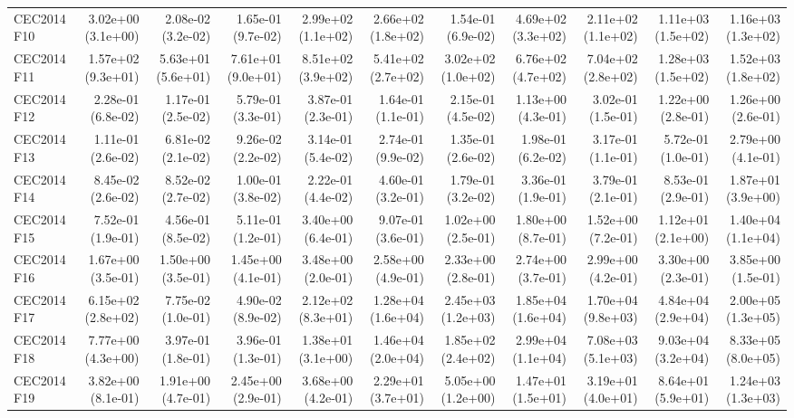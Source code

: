 \begin{longtable}{lrrrrrrrrrr}
CEC2014 F10 & 3.02e+00 (3.1e+00) & 2.08e-02 (3.2e-02) & 1.65e-01 (9.7e-02) & 2.99e+02 (1.1e+02) & 2.66e+02 (1.8e+02) & 1.54e-01 (6.9e-02) & 4.69e+02 (3.3e+02) & 2.11e+02 (1.1e+02) & 1.11e+03 (1.5e+02) & 1.16e+03 (1.3e+02) \\
CEC2014 F11 & 1.57e+02 (9.3e+01) & 5.63e+01 (5.6e+01) & 7.61e+01 (9.0e+01) & 8.51e+02 (3.9e+02) & 5.41e+02 (2.7e+02) & 3.02e+02 (1.0e+02) & 6.76e+02 (4.7e+02) & 7.04e+02 (2.8e+02) & 1.28e+03 (1.5e+02) & 1.52e+03 (1.8e+02) \\
CEC2014 F12 & 2.28e-01 (6.8e-02) & 1.17e-01 (2.5e-02) & 5.79e-01 (3.3e-01) & 3.87e-01 (2.3e-01) & 1.64e-01 (1.1e-01) & 2.15e-01 (4.5e-02) & 1.13e+00 (4.3e-01) & 3.02e-01 (1.5e-01) & 1.22e+00 (2.8e-01) & 1.26e+00 (2.6e-01) \\
CEC2014 F13 & 1.11e-01 (2.6e-02) & 6.81e-02 (2.1e-02) & 9.26e-02 (2.2e-02) & 3.14e-01 (5.4e-02) & 2.74e-01 (9.9e-02) & 1.35e-01 (2.6e-02) & 1.98e-01 (6.2e-02) & 3.17e-01 (1.1e-01) & 5.72e-01 (1.0e-01) & 2.79e+00 (4.1e-01) \\
CEC2014 F14 & 8.45e-02 (2.6e-02) & 8.52e-02 (2.7e-02) & 1.00e-01 (3.8e-02) & 2.22e-01 (4.4e-02) & 4.60e-01 (3.2e-01) & 1.79e-01 (3.2e-02) & 3.36e-01 (1.9e-01) & 3.79e-01 (2.1e-01) & 8.53e-01 (2.9e-01) & 1.87e+01 (3.9e+00) \\
CEC2014 F15 & 7.52e-01 (1.9e-01) & 4.56e-01 (8.5e-02) & 5.11e-01 (1.2e-01) & 3.40e+00 (6.4e-01) & 9.07e-01 (3.6e-01) & 1.02e+00 (2.5e-01) & 1.80e+00 (8.7e-01) & 1.52e+00 (7.2e-01) & 1.12e+01 (2.1e+00) & 1.40e+04 (1.1e+04) \\
CEC2014 F16 & 1.67e+00 (3.5e-01) & 1.50e+00 (3.5e-01) & 1.45e+00 (4.1e-01) & 3.48e+00 (2.0e-01) & 2.58e+00 (4.9e-01) & 2.33e+00 (2.8e-01) & 2.74e+00 (3.7e-01) & 2.99e+00 (4.2e-01) & 3.30e+00 (2.3e-01) & 3.85e+00 (1.5e-01) \\
CEC2014 F17 & 6.15e+02 (2.8e+02) & 7.75e-02 (1.0e-01) & 4.90e-02 (8.9e-02) & 2.12e+02 (8.3e+01) & 1.28e+04 (1.6e+04) & 2.45e+03 (1.2e+03) & 1.85e+04 (1.6e+04) & 1.70e+04 (9.8e+03) & 4.84e+04 (2.9e+04) & 2.00e+05 (1.3e+05) \\
CEC2014 F18 & 7.77e+00 (4.3e+00) & 3.97e-01 (1.8e-01) & 3.96e-01 (1.3e-01) & 1.38e+01 (3.1e+00) & 1.46e+04 (2.0e+04) & 1.85e+02 (2.4e+02) & 2.99e+04 (1.1e+04) & 7.08e+03 (5.1e+03) & 9.03e+04 (3.2e+04) & 8.33e+05 (8.0e+05) \\
CEC2014 F19 & 3.82e+00 (8.1e-01) & 1.91e+00 (4.7e-01) & 2.45e+00 (2.9e-01) & 3.68e+00 (4.2e-01) & 2.29e+01 (3.7e+01) & 5.05e+00 (1.2e+00) & 1.47e+01 (1.5e+01) & 3.19e+01 (4.0e+01) & 8.64e+01 (5.9e+01) & 1.24e+03 (1.3e+03) \\

\end{longtable}
